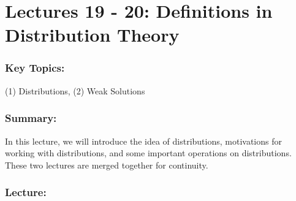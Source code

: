 \documentclass{article}
\begin{document}
\newpage 
\section{Lectures 19 - 20: Definitions in Distribution Theory}
\subsubsection{Key Topics:} (1) Distributions, (2) Weak Solutions 
\subsubsection{Summary:}
In this lecture, we will introduce the idea of distributions, motivations for working with distributions, and some important operations on distributions. These two lectures are merged together for continuity. 
\subsubsection{Lecture:}
\end{document}
